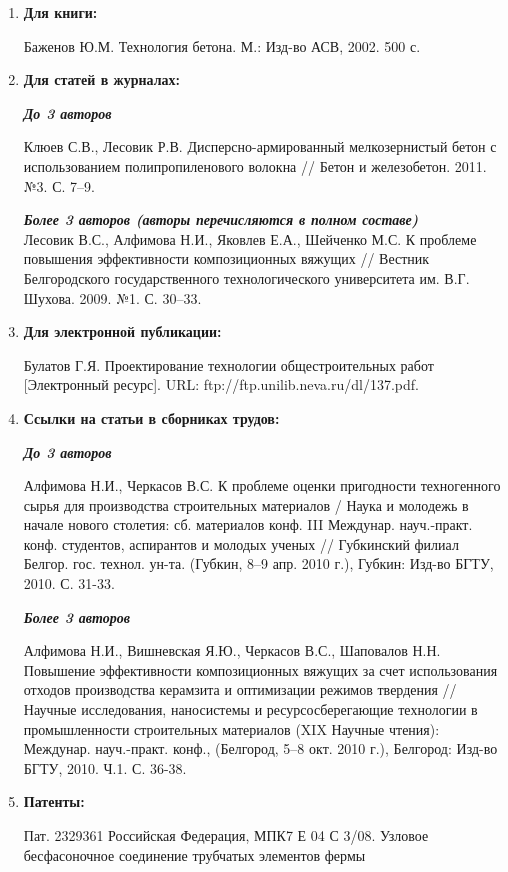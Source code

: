 \documentclass{article}
\begin{document}
\begin{enumerate}
\item\textbf{Для книги:}

Баженов Ю.М. Технология бетона. М.: Изд-во АСВ, 2002. 500 с.

\item\textbf{Для статей в журналах:}

\textbf{\textit{До 3 авторов}}

Клюев С.В., Лесовик Р.В. Дисперсно-армированный мелкозернистый бетон с использованием полипропиленового волокна // Бетон и железобетон. 2011. №3. С. 7–9.

\textbf{\textit{Более 3 авторов (авторы перечисляются в полном составе)}} \\
Лесовик В.С., Алфимова Н.И., Яковлев Е.А., Шейченко М.С. К проблеме повышения эффективности композиционных вяжущих // Вестник Белгородского государственного технологического университета им. В.Г. Шухова. 2009. №1. С. 30–33.

\item\textbf{Для электронной публикации:}

Булатов Г.Я. Проектирование технологии общестроительных работ [Электронный ресурс]. URL: ftp://ftp.unilib.neva.ru/dl/137.pdf.

\item\textbf{Ссылки на статьи в сборниках трудов:}

\textbf{\textit{До 3 авторов}}

Алфимова Н.И., Черкасов В.С. К проблеме оценки пригодности техногенного сырья для производства строительных материалов / Наука и молодежь в начале нового столетия: сб. материалов конф. III Междунар. науч.-практ. конф. студентов, аспирантов и молодых ученых // Губкинский филиал Белгор. гос. технол. ун-та. (Губкин, 8–9 апр. 2010 г.), Губкин: Изд-во БГТУ, 2010. С. 31-33.

\textbf{\textit{Более 3 авторов}}

Алфимова Н.И., Вишневская Я.Ю., Черкасов В.С., Шаповалов Н.Н. Повышение эффективности композиционных вяжущих за счет использования отходов производства керамзита и оптимизации режимов твердения // Научные исследования, наносистемы и ресурсосберегающие технологии в промышленности строительных материалов (XIX Научные чтения): Междунар. науч.-практ. конф., (Белгород, 5–8 окт. 2010 г.), Белгород: Изд-во БГТУ, 2010. Ч.1. С. 36-38.

\item\textbf{Патенты:}

Пат. 2329361 Российская Федерация, МПК7 Е 04 С 3/08. Узловое бесфасоночное соединение трубчатых элементов фермы
\end{enumerate}
\end{document}
